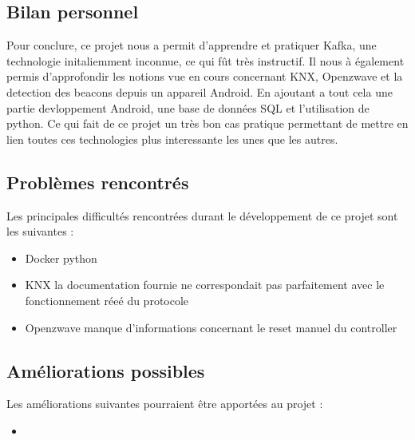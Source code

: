 \subsection{Bilan personnel}
Pour conclure, ce projet nous a permit d'apprendre et pratiquer Kafka, une technologie initaliemment inconnue, ce qui fût très instructif. Il nous à également permis d'approfondir les notions vue en cours concernant KNX, Openzwave et la detection des beacons depuis un appareil Android. En ajoutant a tout cela une partie devloppement Android, une base de données SQL et l'utilisation de python. Ce qui fait de ce projet un très bon cas pratique permettant de mettre en lien toutes ces technologies plus interessante les unes que les autres.

\subsection{Problèmes rencontrés}
Les principales difficultés rencontrées durant le développement de ce projet sont les suivantes :
\begin{itemize}
    \item Docker python
    \item KNX la documentation fournie ne correspondait pas parfaitement avec le fonctionnement réeé du protocole
    \item Openzwave manque d'informations concernant le reset manuel du controller
\end{itemize}

\subsection{Améliorations possibles}
Les améliorations suivantes pourraient être apportées au projet :
\begin{itemize}
    \item
\end{itemize}